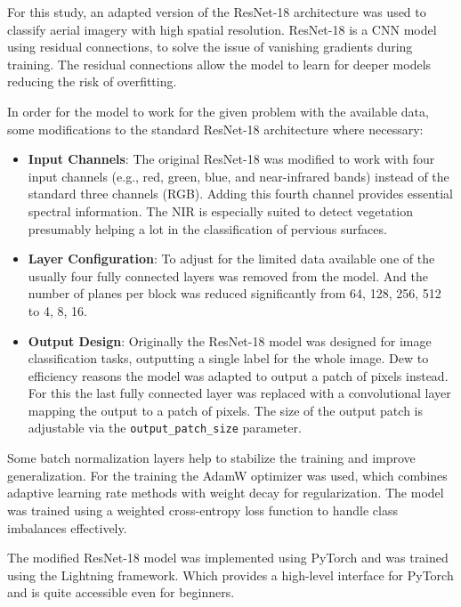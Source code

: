 For this study, an adapted version of the ResNet-18 architecture was used to classify 
aerial imagery with high spatial resolution. ResNet-18 is a CNN model 
using residual connections, to solve the issue of vanishing
gradients during training. The residual connections allow the model to learn
for deeper models reducing the risk of overfitting.

In order for the model to work for the given problem with the available data, some 
modifications to the standard ResNet-18 architecture where necessary:

\begin{itemize}
    \item \textbf{Input Channels}: The original ResNet-18 was modified to work with four input 
    channels (e.g., red, green, blue, and near-infrared bands) instead of the standard
    three channels (RGB). Adding this fourth channel provides essential spectral
    information. The NIR is especially suited to detect vegetation \autocite{rouseMonitoringVegetationSystems1974} 
    presumably helping a lot in the classification of pervious surfaces.

    \item \textbf{Layer Configuration}: To adjust for the limited data available one
    of the usually four fully connected layers was removed from the model. And the
    number of planes per block was reduced significantly from 64, 128, 256, 512 to 4, 8, 16.

    \item \textbf{Output Design}: Originally the ResNet-18 model was designed for image
    classification tasks, outputting a single label for the whole image. Dew to
    efficiency reasons the model was adapted to output a patch of pixels instead.
    For this the last fully connected layer was replaced with a convolutional layer
    mapping the output to a patch of pixels. The size of the output patch is adjustable
    via the \texttt{output\_patch\_size} parameter.
\end{itemize}    

Some batch normalization layers help to stabilize the training and improve generalization.
For the training the AdamW optimizer was used, which combines adaptive learning
rate methods with weight decay for regularization. The model was trained using
a weighted cross-entropy loss function to handle class imbalances effectively.

The modified ResNet-18 model was implemented using PyTorch and was trained using 
the Lightning framework. Which provides a high-level interface for PyTorch
and is quite accessible even for beginners.


